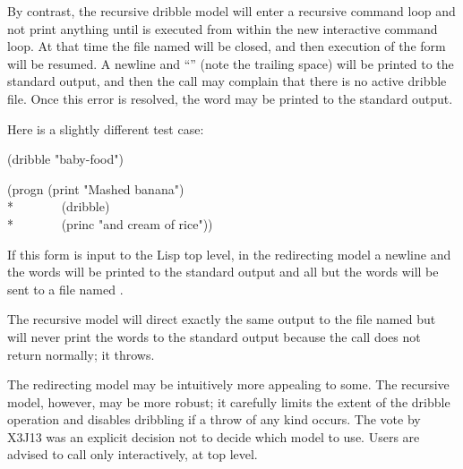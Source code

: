 \begin{defun}[Function]
By contrast, the recursive dribble model will enter a recursive command
loop and not print anything until  is executed from within
the new interactive command loop.  At that time the file named
 will be closed, and then execution of the
 form will be resumed.  A newline and ``'' (note the trailing space)
will be printed to the standard output, and then the call
 may complain that there is no active dribble file.
Once this error is resolved, the word  may be printed
to the standard output.

Here is a slightly different test case:
\begin{lisp}
(dribble "baby-food")
\end{lisp}
\begin{lisp}
(progn (print "Mashed banana") \\*
~~~~~~~(dribble) \\*
~~~~~~~(princ "and cream of rice"))
\end{lisp}
If this form is input to the Lisp top level, in the redirecting model
a newline and the words
 will be printed to the standard output
and all but the words
 will be sent to a file named .

The recursive model will direct exactly the same output to the file
named  but will never print the words
 to the standard output because the call
 does not return normally; it throws.

The redirecting model may be intuitively more appealing to some.
The recursive model, however, may be more robust; it carefully limits
the extent of the dribble operation and disables dribbling if a
throw of any kind occurs.  The vote by X3J13 was an explicit decision
not to decide which model to use.  Users are advised to call 
only interactively, at top level.
\end{defun}


